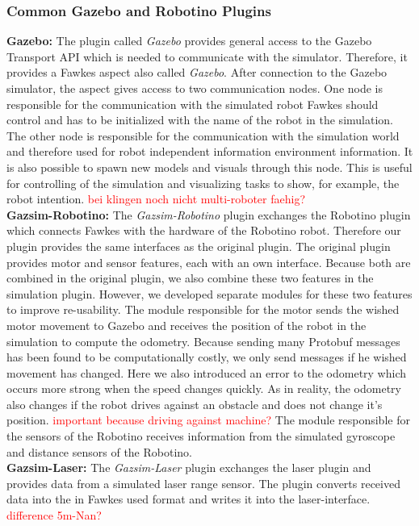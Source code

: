 \subsubsection{Common Gazebo and Robotino Plugins}
\textbf{Gazebo:} The plugin called \textit{Gazebo} provides general access to the Gazebo Transport API which is needed to communicate with the simulator. Therefore, it provides a Fawkes aspect also called \textit{Gazebo}. After connection to the Gazebo simulator, the aspect gives access to two communication nodes. One node is responsible for the communication with the simulated robot Fawkes should control and has to be initialized with the name of the robot in the simulation. The other node is responsible for the communication with the simulation world and therefore used for robot independent information environment information. It is also possible to spawn new models and visuals through this node. This is useful for controlling of the simulation and visualizing tasks to show, for example, the robot intention. \textcolor{red}{bei klingen noch nicht multi-roboter faehig?}
\\
\textbf{Gazsim-Robotino:}
The \textit{Gazsim-Robotino} plugin exchanges the Robotino plugin which connects Fawkes with the hardware of the Robotino robot. Therefore our plugin provides the same interfaces as the original plugin. The original plugin provides motor and sensor features, each with an own interface. Because both are combined in the original plugin, we also combine these two features in the simulation plugin. However, we developed separate modules for these two features to improve re-usability. The module responsible for the motor sends the wished motor movement to Gazebo and receives the position of the robot in the simulation to compute the odometry. Because sending many Protobuf messages has been found to be computationally costly, we only send messages if he wished movement has changed. Here we also introduced an error to the odometry which occurs more strong when the speed changes quickly. As in reality, the odometry also changes if the robot drives against an obstacle and does not change it's position. \textcolor{red}{important because driving against machine?} The module responsible for the sensors of the Robotino receives information from the simulated gyroscope and distance sensors of the Robotino.
\\
\textbf{Gazsim-Laser:}
The \textit{Gazsim-Laser} plugin exchanges the laser plugin and provides data from a simulated laser range sensor. The plugin converts received data into the in Fawkes used format and writes it into the laser-interface. \textcolor{red}{difference 5m-Nan?}
